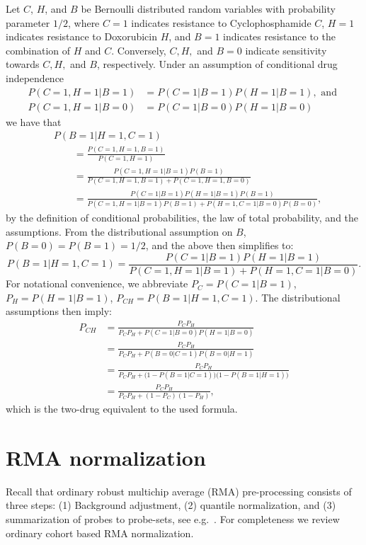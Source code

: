 Let $C$, $H$, and $B$ be Bernoulli distributed random variables with probability parameter $1/2$, where
$C = 1$ indicates resistance to Cyclophosphamide $C$,
$H = 1$ indicates resistance to Doxorubicin $H$, and
$B = 1$ indicates resistance to the combination of $H$ and $C$.
Conversely, $C,H,$ and $B = 0$ indicate sensitivity towards $C,H,$ and $B$, respectively.
Under an assumption of conditional drug independence
\begin{align*}
  P(C=1, H=1| B=1) &= P(C=1 | B=1) P(H=1 | B=1), \text{ and } \\
  P(C=1, H=1| B=0) &= P(C=1 | B=0) P(H=1 | B=0)
\end{align*}
we have that
\begin{align*}
  &P(B=1 | H=1, C=1)
  \\&\qquad
   = \frac{P(C=1, H=1, B=1)}
          {P(C=1, H=1)}
  \\&\qquad
   = \frac{P(C=1, H=1 | B=1) P(B=1)}
          {P(C=1, H=1, B=1) + P(C=1, H=1, B=0)}
  \\&\qquad
   = \frac{P(C=1 | B=1) P(H=1 | B=1) P(B=1)}
          {P(C=1, H=1 | B=1) P(B=1) + P(H=1, C=1| B=0) P(B=0)},
\end{align*}
by the definition of conditional probabilities, the law of total probability, and the assumptions.
From the distributional assumption on $B$, $P(B=0) = P(B=1) = 1/2$, and the above then simplifies to:
\begin{equation*}
  P(B=1 | H=1, C=1)
   = \frac{P(C=1 | B=1) P(H=1 | B=1)}
          {P(C=1, H=1 | B=1) + P(H=1, C=1 | B=0)}.
\end{equation*}
For notational convenience, we abbreviate
$P_C = P(C=1 | B=1)$,
$P_H = P(H=1 | B=1)$,
$P_{CH} = P(B=1 | H=1, C=1)$.
The distributional assumptions then imply:
\begin{align*}
  P_{CH}
  &= \frac{P_C P_H}
          {P_C P_H + P(C=1 | B=0) P(H=1 | B=0)}
  \\
  &= \frac{P_C P_H}
          {P_C P_H + P(B=0 | C=1) P(B=0 | H=1)}
  \\
  &= \frac{P_C P_H}
          {P_C P_H + \bigl(1 - P(B=1 | C=1)\bigr)\bigl(1 - P(B=1 | H=1)\bigr)}
  \\
  &= \frac{P_C P_H}
          {P_C P_H + (1 - P_C)(1 - P_H)},
\end{align*}
which is the two-drug equivalent to the used formula.




\section{RMA normalization} \label{supprma}
Recall that ordinary robust multichip average (RMA) pre-processing consists of three steps: (1) Background adjustment, (2) quantile normalization, and (3) summarization of probes to probe-sets, see e.g.\ \citep{Irizarry2003, Irizarry2003b}. For completeness we review ordinary cohort based RMA normalization.

